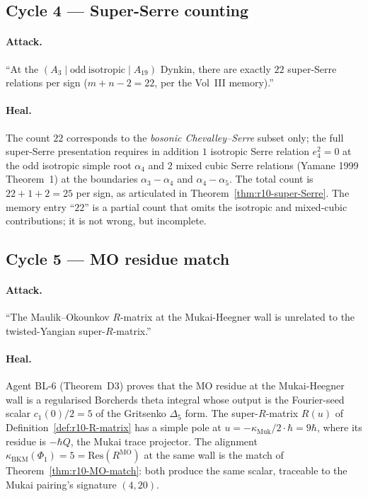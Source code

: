 \documentclass{article}
\providecommand{\kBKM}{\kappa_{\mathrm{BKM}}}
\theoremstyle{definition}
\begin{document}
\subsection{Cycle 4 — Super-Serre counting}

\paragraph{Attack.}
``At the $(A_3 \mid \mathrm{odd\ isotropic} \mid A_{19})$ Dynkin,
there are exactly $22$ super-Serre relations per sign ($m + n - 2 = 22$,
per the Vol~III memory).''

\paragraph{Heal.}
The count $22$ corresponds to the \emph{bosonic Chevalley--Serre}
subset only; the full super-Serre presentation requires in addition
$1$ isotropic Serre relation $e_4^2 = 0$ at the odd isotropic
simple root $\alpha_4$ and $2$ mixed cubic Serre relations
(Yamane 1999 Theorem~1) at the boundaries $\alpha_3 - \alpha_4$ and
$\alpha_4 - \alpha_5$. The total count is $22 + 1 + 2 = 25$ per sign,
as articulated in Theorem~\ref{thm:r10-super-Serre}. The memory
entry ``$22$'' is a partial count that omits the isotropic and
mixed-cubic contributions; it is not wrong, but incomplete.

\subsection{Cycle 5 — MO residue match}

\paragraph{Attack.}
``The Maulik--Okounkov $R$-matrix at the Mukai-Heegner wall is
unrelated to the twisted-Yangian super-$R$-matrix.''

\paragraph{Heal.}
Agent BL-6 (Theorem~D3) proves that the MO residue at the
Mukai-Heegner wall is a regularised Borcherds theta integral whose
output is the Fourier-seed scalar $c_1(0)/2 = 5$ of the Gritsenko
$\Delta_5$ form. The super-$R$-matrix $R(u)$ of
Definition~\ref{def:r10-R-matrix} has a simple pole at
$u = -\kappa_{\mathrm{Muk}}/2 \cdot \hbar = 9 \hbar$, where its
residue is $-\hbar Q$, the Mukai trace projector. The alignment
$\kBKM(\Phi_1) = 5 = \mathrm{Res}(R^{\mathrm{MO}})$ at the same wall
is the match of Theorem~\ref{thm:r10-MO-match}: both produce the
same scalar, traceable to the Mukai pairing's signature $(4, 20)$.
\end{document}
